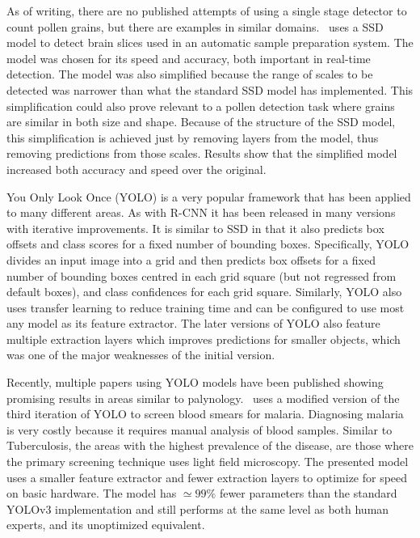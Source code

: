As of writing, there are no published attempts of using a single stage detector to count pollen grains, but there are examples in similar domains.~\cite{liu_brain_2018} uses a SSD model to detect brain slices used in an automatic sample preparation system.
The model was chosen for its speed and accuracy, both important in real-time detection.
The model was also simplified because the range of scales to be detected was narrower than what the standard SSD model has implemented.
This simplification could also prove relevant to a pollen detection task where grains are similar in both size and shape.
Because of the structure of the SSD model, this simplification is achieved just by removing layers from the model, thus removing predictions from those scales.
Results show that the simplified model increased both accuracy and speed over the original.

You Only Look Once (YOLO) is a very popular framework that has been applied to many different areas.
As with R-CNN it has been released in many versions with iterative improvements.
It is similar to SSD in that it also predicts box offsets and class scores for a fixed number of bounding boxes.
Specifically, YOLO divides an input image into a grid and then predicts box offsets for a fixed number of bounding boxes centred in each grid square (but not regressed from default boxes), and class confidences for each grid square.
Similarly, YOLO also uses transfer learning to reduce training time and can be configured to use most any model as its feature extractor.
The later versions of YOLO also feature multiple extraction layers which improves predictions for smaller objects, which was one of the major weaknesses of the initial version.

Recently, multiple papers using YOLO models have been published showing promising results in areas similar to palynology.~\cite{chibuta_real_time_2020} uses a modified version of the third iteration of YOLO to screen blood smears for malaria.
Diagnosing malaria is very costly because it requires manual analysis of blood samples.
Similar to Tuberculosis, the areas with the highest prevalence of the disease, are those where the primary screening technique uses light field microscopy.
The presented model uses a smaller feature extractor and fewer extraction layers to optimize for speed on basic hardware.
The model has \( \simeq 99\% \) fewer parameters than the standard YOLOv3 implementation and still performs at the same level as both human experts, and its unoptimized equivalent.

